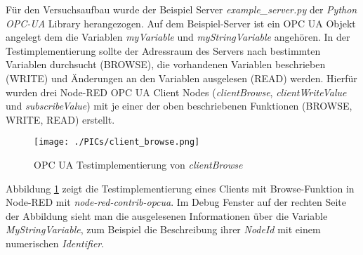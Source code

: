 \documentclass[BMR,Bachelor,ngerman]{twbook}%
\begin{document}
Für den Versuchsaufbau wurde der Beispiel Server \emph{example\_server.py} der \emph{Python OPC-UA} Library herangezogen. Auf dem Beispiel-Server ist ein \ac{OPC UA} Objekt angelegt dem die Variablen \emph{myVariable} und \emph{myStringVariable} angehören. In der Testimplementierung sollte der Adressraum des Servers nach bestimmten Variablen durchsucht (BROWSE), die vorhandenen Variablen beschrieben (WRITE) und Änderungen an den Variablen ausgelesen (READ) werden. Hierfür wurden drei Node-RED \ac{OPC UA} Client Nodes (\emph{clientBrowse}, \emph{clientWriteValue} und \emph{subscribeValue}) mit je einer der oben beschriebenen Funktionen (BROWSE, WRITE, READ) erstellt. %
\begin{figure}[H]
\centering
\texttt{[image: ./PICs/client\_browse.png]}
\caption{\ac{OPC UA} Testimplementierung von \emph{clientBrowse}}\label{fig:client_browse}
\end{figure}
Abbildung \ref{fig:client_browse} zeigt die Testimplementierung eines Clients mit Browse-Funktion in Node-RED mit \emph{node-red-contrib-opcua}. Im Debug Fenster auf der rechten Seite der Abbildung sieht man die ausgelesenen Informationen über die Variable \emph{MyStringVariable}, zum Beispiel die Beschreibung ihrer \emph{NodeId} mit einem numerischen \emph{Identifier}.  %
\end{document}
